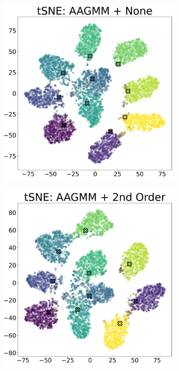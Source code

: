 \documentclass[10pt,twocolumn,letterpaper]{article}
\begin{document}
\begin{figure}[h]
\begin{subfigure}[t]{.49\columnwidth}
		\subcaption{}
	\end{subfigure}
	\begin{subfigure}[t]{.49\columnwidth}
		\includegraphics[width=\textwidth]{figures/id-00000120-tsne.jpg}
		\subcaption{}
	\end{subfigure}
	\begin{subfigure}[t]{.49\columnwidth}
		\includegraphics[width=\textwidth]{figures/id-00000054-tsne.jpg}
		\subcaption{}
	\end{subfigure}
	

\end{figure}
\end{document}
